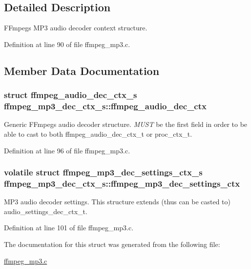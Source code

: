 \subsection{Detailed Description}
F\+Fmpeg\textquotesingle{}s M\+P3 audio decoder context structure. 

Definition at line 90 of file ffmpeg\+\_\+mp3.\+c.



\subsection{Member Data Documentation}
\subsubsection[{\texorpdfstring{ffmpeg\+\_\+audio\+\_\+dec\+\_\+ctx}{ffmpeg_audio_dec_ctx}}]{\setlength{\rightskip}{0pt plus 5cm}struct {\bf ffmpeg\+\_\+audio\+\_\+dec\+\_\+ctx\+\_\+s} ffmpeg\+\_\+mp3\+\_\+dec\+\_\+ctx\+\_\+s\+::ffmpeg\+\_\+audio\+\_\+dec\+\_\+ctx}\hypertarget{structffmpeg__mp3__dec__ctx__s_a16bbe11f4a4b51208b0a2cb998a75bb7}{}\label{structffmpeg__mp3__dec__ctx__s_a16bbe11f4a4b51208b0a2cb998a75bb7}
Generic F\+Fmpeg\textquotesingle{}s audio decoder structure. {\itshape M\+U\+ST} be the first field in order to be able to cast to both ffmpeg\+\_\+audio\+\_\+dec\+\_\+ctx\+\_\+t or proc\+\_\+ctx\+\_\+t. 

Definition at line 96 of file ffmpeg\+\_\+mp3.\+c.

\subsubsection[{\texorpdfstring{ffmpeg\+\_\+mp3\+\_\+dec\+\_\+settings\+\_\+ctx}{ffmpeg_mp3_dec_settings_ctx}}]{\setlength{\rightskip}{0pt plus 5cm}volatile struct {\bf ffmpeg\+\_\+mp3\+\_\+dec\+\_\+settings\+\_\+ctx\+\_\+s} ffmpeg\+\_\+mp3\+\_\+dec\+\_\+ctx\+\_\+s\+::ffmpeg\+\_\+mp3\+\_\+dec\+\_\+settings\+\_\+ctx}\hypertarget{structffmpeg__mp3__dec__ctx__s_adcc96548bcf6aab1843b95c9c76e26a9}{}\label{structffmpeg__mp3__dec__ctx__s_adcc96548bcf6aab1843b95c9c76e26a9}
M\+P3 audio decoder settings. This structure extends (thus can be casted to) audio\+\_\+settings\+\_\+dec\+\_\+ctx\+\_\+t. 

Definition at line 101 of file ffmpeg\+\_\+mp3.\+c.



The documentation for this struct was generated from the following file\+:\begin{DoxyCompactItemize}
\item 
\hyperlink{ffmpeg__mp3_8c}{ffmpeg\+\_\+mp3.\+c}\end{DoxyCompactItemize}
